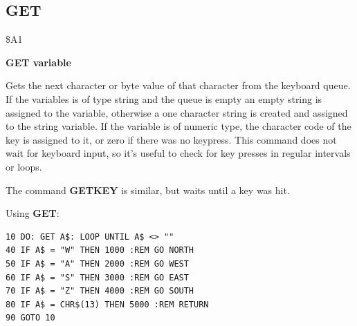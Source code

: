 
\newpage
\subsection{GET}
\begin{description}[leftmargin=2cm,style=nextline]
\item [Token:] \$A1
\item [Format:] {\bf GET variable}
\item [Usage:] Gets the next character or byte value of that character
               from the keyboard queue.
               If the variables is of type string and the queue is empty
               an empty string is assigned to the variable,
               otherwise a one character string is created
               and assigned to the string variable.
               If the variable is of numeric type, the character code
               of the key is assigned to it, or zero if there was no keypress.
               This command does not wait for keyboard
               input, so it's useful to check for key presses
               in regular intervals or loops.

\item [Remarks:] The command {\bf GETKEY} is similar, but waits
                 until a key was hit.

\item [Example:] Using {\bf GET}:
\begin{tcolorbox}[colback=black,coltext=white]
\verbatimfont{\codefont}
\begin{verbatim}
10 DO: GET A$: LOOP UNTIL A$ <> ""
40 IF A$ = "W" THEN 1000 :REM GO NORTH
50 IF A$ = "A" THEN 2000 :REM GO WEST
60 IF A$ = "S" THEN 3000 :REM GO EAST
70 IF A$ = "Z" THEN 4000 :REM GO SOUTH
80 IF A$ = CHR$(13) THEN 5000 :REM RETURN
90 GOTO 10
\end{verbatim}
\end{tcolorbox}
\end{description}


\newpage
